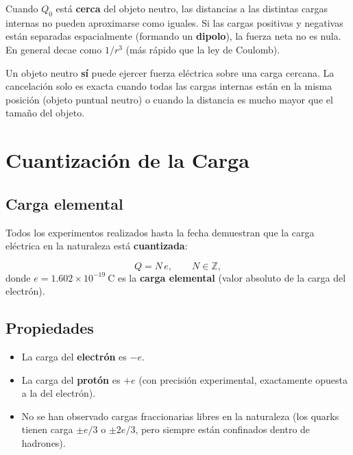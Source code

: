 \documentclass[12pt,a4paper]{article}
\begin{document}
Cuando $Q_0$ está \textbf{cerca} del objeto neutro, las distancias a las distintas cargas internas no pueden aproximarse como iguales. Si las cargas positivas y negativas están separadas espacialmente (formando un \textbf{dipolo}), la fuerza neta no es nula. En general decae como $1/r^3$ (más rápido que la ley de Coulomb).

\begin{warnbox}
Un objeto neutro \textbf{sí} puede ejercer fuerza eléctrica sobre una carga cercana. La cancelación solo es exacta cuando todas las cargas internas están en la misma posición (objeto puntual neutro) o cuando la distancia es mucho mayor que el tamaño del objeto.
\end{warnbox}

\section{Cuantización de la Carga}

\subsection{Carga elemental}

Todos los experimentos realizados hasta la fecha demuestran que la carga eléctrica en la naturaleza está \textbf{cuantizada}:

\begin{keybox}
\[
\boxed{Q = N\,e},\qquad N \in \mathbb{Z},
\]
donde $e = 1.602\times10^{-19}\ \text{C}$ es la \textbf{carga elemental} (valor absoluto de la carga del electrón).
\end{keybox}

\subsection{Propiedades}

\begin{itemize}[nosep]
  \item La carga del \textbf{electrón} es $-e$.
  \item La carga del \textbf{protón} es $+e$ (con precisión experimental, exactamente opuesta a la del electrón).
  \item No se han observado cargas fraccionarias libres en la naturaleza (los quarks tienen carga $\pm e/3$ o $\pm 2e/3$, pero siempre están confinados dentro de hadrones).
\end{itemize}
\end{document}
